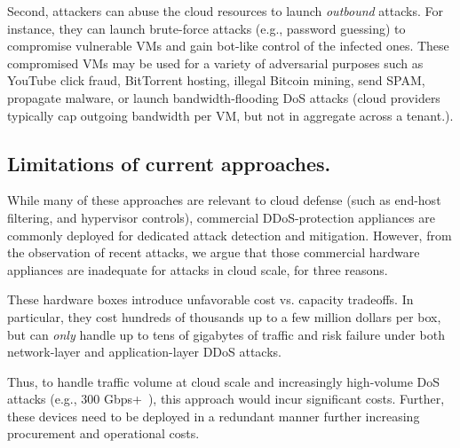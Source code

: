 Second, attackers can abuse the cloud resources to launch \emph{outbound} attacks.
For instance, they can launch brute-force attacks (e.g., password guessing) to 
compromise vulnerable VMs 
and gain bot-like control of the infected ones.
%
These compromised VMs may be used for a variety of adversarial purposes such as
YouTube click fraud, BitTorrent hosting, illegal Bitcoin
mining, send SPAM, propagate malware, or launch bandwidth-flooding DoS attacks
(cloud providers typically cap outgoing bandwidth per VM, but not in aggregate across a tenant.).

\subsection{Limitations of current approaches.}
%
While many of these approaches are relevant to cloud defense (such as
end-host filtering, and hypervisor controls), commercial DDoS-protection
 appliances are commonly deployed for dedicated attack detection and mitigation. 
However, from the observation of recent attacks, we argue that those commercial hardware appliances 
are inadequate for attacks in cloud scale, for
three reasons.


 These hardware boxes introduce unfavorable cost
vs. capacity tradeoffs. In particular, they cost hundreds of thousands
up to a few million dollars per box, but can {\em only} handle up to
tens of gigabytes of traffic and risk failure under both network-layer
and application-layer DDoS attacks.
~\cite{ADC}

Thus, to handle
traffic volume at cloud scale and increasingly high-volume DoS attacks 
(e.g., 300 Gbps+~\cite{Prolexic}), this approach would incur significant costs. Further, these devices
need to be deployed in a redundant manner further increasing procurement and 
operational costs. 

